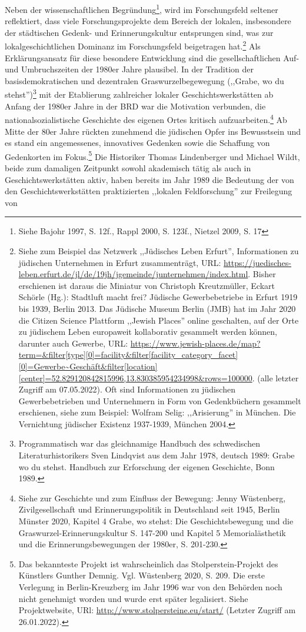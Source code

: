 Neben der wissenschaftlichen Begründung\footnote{Siehe Bajohr 1997, S. 12f., Rappl 2000, S. 123f., Nietzel 2009, S. 17}, wird im Forschungsfeld seltener reflektiert, dass viele Forschungsprojekte dem Bereich der lokalen, insbesondere der städtischen Gedenk- und Erinnerungskultur entsprungen sind, was zur lokalgeschichtlichen Dominanz im Forschungsfeld beigetragen hat.\footnote{Siehe zum Beispiel das Netzwerk ,,Jüdisches Leben Erfurt'', Informationen zu jüdischen Unternehmen in Erfurt zusammenträgt, URL: \url{https://juedisches-leben.erfurt.de/jl/de/19jh/jgemeinde/junternehmen/index.html}. Bisher erschienen ist daraus die Miniatur von Christoph Kreutzmüller, Eckart Schörle (Hg.): Stadtluft macht frei? Jüdische Gewerbebetriebe in Erfurt 1919 bis 1939, Berlin 2013. Das Jüdische Museum Berlin (JMB) hat im Jahr 2020 die Citizen Science Plattform ,,Jewish Places'' online geschalten, auf der Orte zu jüdischem Leben europaweit kollaborativ gesammelt werden können, darunter auch Gewerbe, URL: \url{https://www.jewish-places.de/map?term=&filter[type][0]=facility&filter[facility_category_facet][0]=Gewerbe~Geschäft&filter[location][center]=52.829120842815996,13.830385954234998&rows=100000}. (alle letzter Zugriff am 07.05.2022). Oft sind Informationen zu jüdischen Gewerbebetrieben und Unternehmern in Form von Gedenkbüchern gesammelt erschienen, siehe zum Beispiel: Wolfram Selig: ,,Arisierung'' in München. Die Vernichtung jüdischer Existenz 1937-1939, München 2004.} Als Erklärungsansatz für diese besondere Entwicklung sind die gesellschaftlichen Auf- und Umbruchszeiten der 1980er Jahre plausibel. In der Tradition der basisdemokratischen und dezentralen Graswurzelbegewegung (,,Grabe, wo du stehst'')\footnote{Programmatisch war das gleichnamige Handbuch des schwedischen Literaturhistorikers Sven Lindqvist aus dem Jahr 1978, deutsch 1989: Grabe wo du stehst. Handbuch zur Erforschung der eigenen Geschichte, Bonn 1989.} mit der Etablierung zahlreicher lokaler Geschichtswerkstätten ab Anfang der 1980er Jahre in der BRD war die Motivation verbunden, die nationalsozialistische Geschichte des eigenen Ortes kritisch aufzuarbeiten.\footnote{Siehe zur Geschichte und zum Einfluss der Bewegung: Jenny Wüstenberg, Zivilgesellschaft und Erinnerungspolitik in Deutschland seit 1945, Berlin Münster 2020, Kapitel 4 Grabe, wo stehst: Die Geschichtsbewegung und die Graswurzel-Erinnerungskultur S. 147-200 und Kapitel 5 Memorialästhetik und die Erinnerungsbewegungen der 1980er, S. 201-230.} Ab Mitte der 80er Jahre rückten zunehmend die jüdischen Opfer ins Bewusstsein und es stand ein angemessenes, innovatives Gedenken sowie die Schaffung von Gedenkorten im Fokus.\footnote{Das bekannteste Projekt ist wahrscheinlich das Stolperstein-Projekt des Künstlers Gunther Demnig. Vgl. Wüstenberg 2020, S. 209. Die erste Verlegung in Berlin-Kreuzberg im Jahr 1996 war von den Behörden noch nicht genehmigt worden und wurde erst später legalisiert. Siehe Projektwebsite, URl: \url{http://www.stolpersteine.eu/start/} (Letzter Zugriff am 26.01.2022).} Die Historiker Thomas Lindenberger und Michael Wildt, beide zum damaligen Zeitpunkt sowohl akademisch tätig als auch in Geschichtswerkstätten aktiv, haben bereits im Jahr 1989 die Bedeutung der von den Geschichtswerkstätten praktizierten ,,lokalen Feldforschung'' zur Freilegung von 